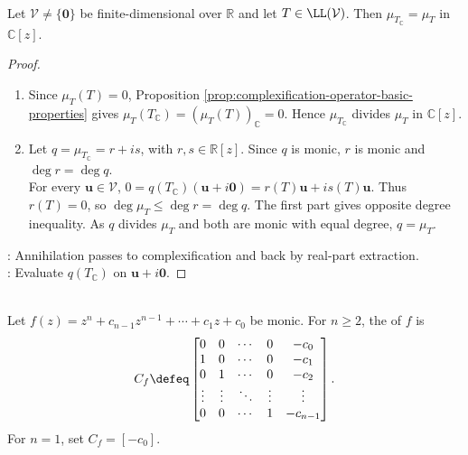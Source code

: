\begin{proposition} \label{prop:minimal-polynomial-complexification} \\
Let $\mathcal{V}\neq\{\mathbf{0}\}$ be finite-dimensional over $\mathbb{R}$ and let $T\in\LL(\mathcal{V})$. Then $\mu_{T_{\mathbb{C}}}=\mu_T$ in $\mathbb{C}[z]$.
\begin{proof}
\begin{enumerate}[label=\roman*.]
\setlength{\itemsep}{0pt}
\item[$(\Rightarrow)$] Since $\mu_T(T)=0$, Proposition \ref{prop:complexification-operator-basic-properties} gives $\mu_T(T_{\mathbb{C}})=(\mu_T(T))_{\mathbb{C}}=0$. Hence $\mu_{T_{\mathbb{C}}}$ divides $\mu_T$ in $\mathbb{C}[z]$.
\item[$(\Leftarrow)$] Let $q=\mu_{T_{\mathbb{C}}}=r+is$, with $r,s\in\mathbb{R}[z]$. Since $q$ is monic, $r$ is monic and $\deg r=\deg q$.\\
For every $\mathbf{u}\in\mathcal{V}$, $0=q(T_{\mathbb{C}})(\mathbf{u}+i\mathbf{0})=r(T)\mathbf{u}+is(T)\mathbf{u}$. Thus $r(T)=0$, so $\deg\mu_T\leq\deg r=\deg q$. The first part gives opposite degree inequality. As $q$ divides $\mu_T$ and both are monic with equal degree, $q=\mu_T$.
\end{enumerate}
: Annihilation passes to complexification and back by real-part extraction.\\
: Evaluate $q(T_{\mathbb{C}})$ on $\mathbf{u}+i\mathbf{0}$.
\end{proof}
\end{proposition}

\begin{definition} \label{def:companion-matrix} \\
Let $f(z)=z^n+c_{n-1}z^{n-1}+\cdots+c_1z+c_0$ be monic. For $n\geq2$, the  of $f$ is
\begin{align}
C_f\defeq
\begin{bmatrix}
0&0&\cdots&0&-c_0\\
1&0&\cdots&0&-c_1\\
0&1&\cdots&0&-c_2\\
\vdots&\vdots&\ddots&\vdots&\vdots\\
0&0&\cdots&1&-c_{n-1}
\end{bmatrix}.
\nonumber
\end{align}
For $n=1$, set $C_f=[-c_0]$.
\end{definition}

